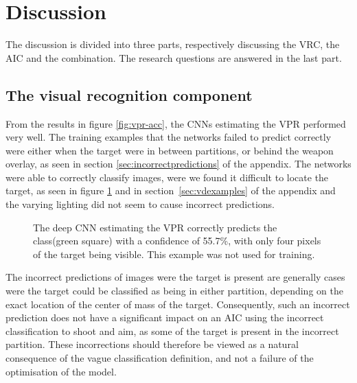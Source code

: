
\section{Discussion}
\label{sec:discussion}
The discussion is divided into three parts, respectively discussing the VRC, the AIC and the combination. The research questions are answered in the last part.

\subsection{The visual recognition component}
From the results in figure \ref{fig:vpr-acc}, the CNNs estimating the VPR performed very well. The training examples that the networks failed to predict correctly were either when the target were in between partitions, or behind the weapon overlay, as seen in section \ref{sec:incorrectpredictions} of the appendix. The networks were able to correctly classify images, were we found it difficult to locate the target, as seen in figure \ref{fig:hardprediction} and in section~\ref{sec:vdexamples} of the appendix and the varying lighting did not seem to cause incorrect predictions.

\begin{figure}[H]
	\begin{scriptsize}
		\sffamily
		\def\svgwidth{\textwidth}
		
	\end{scriptsize}
	\caption[Difficult VPR classification example]{The deep CNN estimating the VPR correctly predicts the class(green square) with a confidence of 55.7\%, with only four pixels of the target being visible. This example was not used for training.}
	\label{fig:hardprediction}
\end{figure}

The incorrect predictions of images were the target is present are generally cases were the target could be classified as being in either partition, depending on the exact location of the center of mass of the target. Consequently, such an incorrect prediction does not have a significant impact on an AIC using the incorrect classification to shoot and aim, as some of the target is present in the incorrect partition. These incorrections should therefore be viewed as a natural consequence of the vague classification definition, and not a failure of the optimisation of the model.

